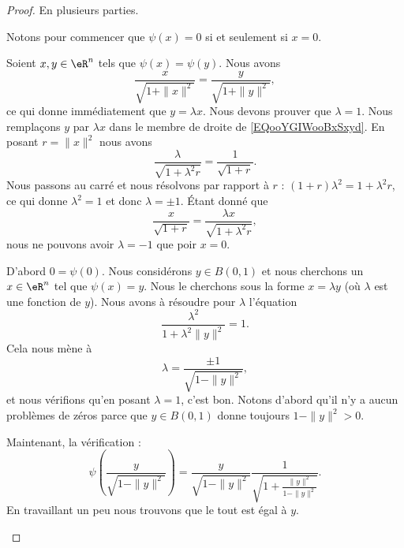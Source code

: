 \begin{proof}
	En plusieurs parties.
	\begin{subproof}
		\spitem[Injective]
		Notons pour commencer que \( \psi(x)=0\) si et seulement si \( x=0\).

		Soient \( x,y\in \eR^n\) tels que \( \psi(x)=\psi(y)\). Nous avons
		\begin{equation}		\label{EQooYGIWooBxSxyd}
			\frac{ x }{ \sqrt{1+\| x \|^2} }=\frac{ y }{ \sqrt{1+\| y \|^2} },
		\end{equation}
		ce qui donne immédiatement que \( y=\lambda x\). Nous devons prouver que \( \lambda=1\). Nous remplaçons \( y\) par \( \lambda x\) dans le membre de droite de \eqref{EQooYGIWooBxSxyd}. En posant \( r=\| x \|^2\) nous avons
		\begin{equation}
			\frac{ \lambda }{ \sqrt{ 1+\lambda^2 r } }=\frac{1}{ \sqrt{ 1+r }}.
		\end{equation}
		Nous passons au carré et nous résolvons par rapport à \( r\) : \( (1+r)\lambda^2=1+\lambda^2r\), ce qui donne \( \lambda^2=1\) et donc \( \lambda=\pm 1\). Étant donné que
		\begin{equation}
			\frac{ x }{ \sqrt{ 1+ r } }=\frac{ \lambda x }{ \sqrt{ 1+\lambda^2r } },
		\end{equation}
		nous ne pouvons avoir \( \lambda=-1\) que poir \( x=0\).

		\spitem[surjectif]
		D'abord \( 0=\psi(0)\). Nous considérons \( y\in B(0,1)\) et nous cherchons un \( x\in \eR^n\) tel que \( \psi(x)=y\). Nous le cherchons sous la forme \( x=\lambda y\) (où \( \lambda\) est une fonction de \( y\)). Nous avons à résoudre pour \( \lambda\) l'équation
		\begin{equation}
			\frac{ \lambda^2 }{ 1+\lambda^2\| y \|^2 }=1.
		\end{equation}
		Cela nous mène à
		\begin{equation}
			\lambda=\frac{ \pm 1 }{ \sqrt{ 1-\| y \|^2 } },
		\end{equation}
		et nous vérifions qu'en posant \( \lambda=1\), c'est bon. Notons d'abord qu'il n'y a aucun problèmes de zéros parce que \( y\in B(0,1)\) donne toujours \( 1-\| y \|^2>0\).

		Maintenant, la vérification :
		\begin{equation}
			\psi\left( \frac{ y }{ \sqrt{ 1-\| y \|^2 } } \right)=\frac{ y }{ \sqrt{ 1-\| y \|^2 } }\frac{1}{ \sqrt{ 1+\frac{ \| y \|^2 }{ 1-\| y \|^2 } }}.
		\end{equation}
		En travaillant un peu nous trouvons que le tout est égal à \( y\).


\end{subproof}
\end{proof}
